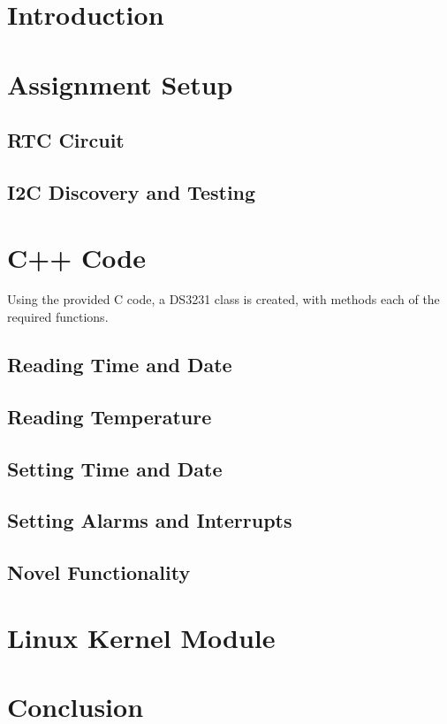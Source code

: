 \documentclass[a4paper 12pt]{article}
\begin{document}
\hypersetup{pageanchor=false}

\hypersetup{pageanchor=true}


\tableofcontents
\clearpage
\section{Introduction}

\section{Assignment Setup}
\subsection{RTC Circuit}

\subsection{I2C Discovery and Testing}

\section{C++ Code}
Using the provided C code, a DS3231 class is created, with methods each of the
required functions.
\subsection{Reading Time and Date}

\subsection{Reading Temperature}

\subsection{Setting Time and Date}

\subsection{Setting Alarms and Interrupts}

\subsection{Novel Functionality}

\section{Linux Kernel Module}

\section{Conclusion}

\clearpage
\printbibliography
\end{document}
